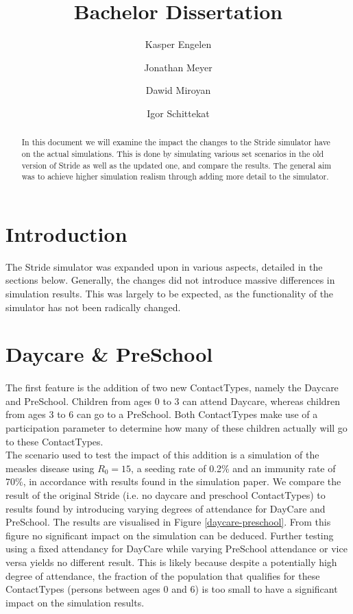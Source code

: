 \documentclass[runningheads]{llncs}
\begin{document}
%
\title{Bachelor Dissertation}
%
%
\author{Kasper Engelen\and
		Jonathan Meyer\and
		Dawid Miroyan\and
		Igor Schittekat}
%
%
%
\maketitle              %
%
\begin{abstract}
In this document we will examine the impact the changes to the Stride simulator have on the actual simulations. This is done by simulating various set scenarios in the old version of Stride as well as the updated one, and compare the results. The general aim was to achieve higher simulation realism through adding more detail to the simulator. 

\end{abstract}
%
%
%

\section{Introduction}
The Stride simulator was expanded upon in various aspects, detailed in the sections below. Generally, the changes did not introduce massive differences in simulation results. This was largely to be expected, as the functionality of the simulator has not been radically changed.


\section{Daycare \& PreSchool}
\paragraph{}
The first feature is the addition of two new ContactTypes, namely the Daycare and PreSchool. Children from ages 0 to 3 can attend Daycare, whereas children from ages 3 to 6 can go to a PreSchool. Both ContactTypes make use of a participation parameter to determine how many of these children actually will go to these ContactTypes. \\
The scenario used to test the impact of this addition is a simulation of the measles disease using $R_0 = 15$, a seeding rate of 0.2\% and an immunity rate of 70\%, in accordance with results found in the simulation paper. We compare the result of the original Stride (i.e. no daycare and preschool ContactTypes) to results found by introducing varying degrees of attendance for  DayCare and PreSchool. The results are visualised in Figure \ref{daycare-preschool}. From this figure no significant impact on the simulation can be deduced. Further testing using a fixed attendancy for DayCare while varying PreSchool attendance or vice versa yields no different result. This is likely because despite a potentially high degree of attendance, the fraction of the population that qualifies for these ContactTypes (persons between ages 0 and 6) is too small to have a significant impact on the simulation results.
\end{document}
